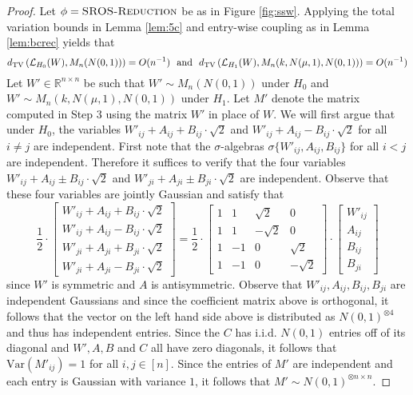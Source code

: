 \begin{proof}
Let $\phi = \textsc{SROS-Reduction}$ be as in Figure \ref{fig:ssw}. Applying the total variation bounds in Lemma \ref{lem:5c} and entry-wise coupling as in Lemma \ref{lem:bcrec} yields that
$$d_{\text{TV}}\left( \mathcal{L}_{H_0}(W), M_n(N(0, 1)) \right) = O(n^{-1}) \ \ \text{and} \ \ d_{\text{TV}}\left( \mathcal{L}_{H_1}(W), M_n(k, N(\mu, 1), N(0, 1)) \right) = O(n^{-1})$$
Let $W' \in \mathbb{R}^{n \times n}$ be such that $W' \sim M_n(N(0, 1))$ under $H_0$ and $W' \sim M_n(k, N(\mu, 1), N(0, 1))$ under $H_1$. Let $M'$ denote the matrix computed in Step 3 using the matrix $W'$ in place of $W$. We will first argue that under $H_0$, the variables $W'_{ij} + A_{ij} + B_{ij} \cdot \sqrt{2}$ and $W'_{ij} + A_{ij} - B_{ij} \cdot \sqrt{2}$ for all $i \neq j$ are independent. First note that the $\sigma$-algebras $\sigma\{ W'_{ij}, A_{ij}, B_{ij} \}$ for all $i < j$ are independent. Therefore it suffices to verify that the four variables $W'_{ij} + A_{ij} \pm B_{ij} \cdot \sqrt{2}$ and $W'_{ji} + A_{ji} \pm B_{ji} \cdot \sqrt{2}$ are independent. Observe that these four variables are jointly Gaussian and satisfy that
$$\frac{1}{2} \cdot \left[ \begin{matrix} W'_{ij} + A_{ij} + B_{ij} \cdot \sqrt{2} \\ W'_{ij} + A_{ij} - B_{ij} \cdot \sqrt{2} \\ W'_{ji} + A_{ji} + B_{ji} \cdot \sqrt{2} \\ W'_{ji} + A_{ji} - B_{ji} \cdot \sqrt{2}\end{matrix} \right] = \frac{1}{2} \cdot \left[ \begin{matrix} 1 & 1 & \sqrt{2} & 0 \\ 1 & 1 & - \sqrt{2} & 0 \\ 1 & - 1 & 0 & \sqrt{2} \\ 1 & - 1 & 0 & -\sqrt{2} \end{matrix} \right] \cdot \left[ \begin{matrix} W'_{ij} \\ A_{ij} \\ B_{ij} \\ B_{ji} \end{matrix} \right]$$
since $W'$ is symmetric and $A$ is antisymmetric. Observe that $W'_{ij}, A_{ij}, B_{ij}, B_{ji}$ are independent Gaussians and since the coefficient matrix above is orthogonal, it follows that the vector on the left hand side above is distributed as $N(0, 1)^{\otimes 4}$ and thus has independent entries. Since the $C$ has i.i.d. $N(0, 1)$ entries off of its diagonal and $W', A, B$ and $C$ all have zero diagonals, it follows that $\text{Var}(M'_{ij}) = 1$ for all $i, j \in [n]$. Since the entries of $M'$ are independent and each entry is Gaussian with variance $1$, it follows that $M' \sim N(0, 1)^{\otimes n \times n}$.


\end{proof}
